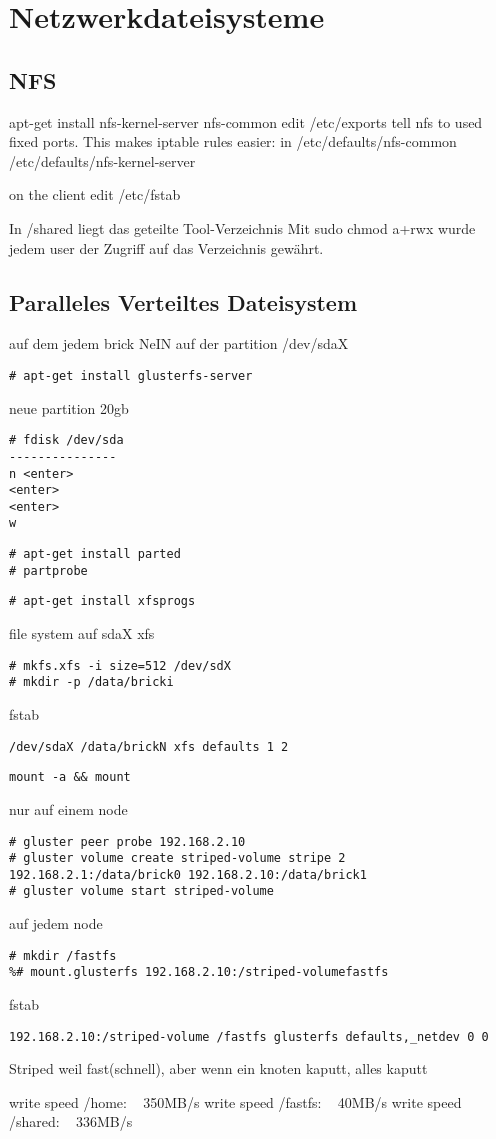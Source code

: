 \chapter{Netzwerkdateisysteme}
\section{NFS}
apt-get install nfs-kernel-server nfs-common
edit /etc/exports
tell nfs to used fixed ports. This makes iptable rules easier:
in /etc/defaults/nfs-common
/etc/defaults/nfs-kernel-server

on the client edit /etc/fstab

In /shared liegt das geteilte Tool-Verzeichnis
Mit sudo chmod a+rwx wurde jedem user der Zugriff auf das Verzeichnis gewährt.

\section{Paralleles Verteiltes Dateisystem}
auf dem jedem brick NeIN auf der partition /dev/sdaX
\begin{lstlisting}[style=Bash]
# apt-get install glusterfs-server
\end{lstlisting}
neue partition 20gb
\begin{lstlisting}[style=Bash]
# fdisk /dev/sda
---------------
n <enter>
<enter>
<enter>
w
\end{lstlisting}
\begin{lstlisting}[style=Bash]
# apt-get install parted
# partprobe
\end{lstlisting}
\begin{lstlisting}[style=Bash]
# apt-get install xfsprogs
\end{lstlisting}

file system auf sdaX xfs
\begin{lstlisting}[style=Bash]
# mkfs.xfs -i size=512 /dev/sdX
# mkdir -p /data/bricki
\end{lstlisting}
fstab
\begin{lstlisting}[style=Bash]
/dev/sdaX /data/brickN xfs defaults 1 2
\end{lstlisting}
\begin{lstlisting}[style=Bash]
mount -a && mount
\end{lstlisting}
nur auf einem node
\begin{lstlisting}[style=Bash]
# gluster peer probe 192.168.2.10
# gluster volume create striped-volume stripe 2 192.168.2.1:/data/brick0 192.168.2.10:/data/brick1
# gluster volume start striped-volume
\end{lstlisting}

auf jedem node
\begin{lstlisting}[style=Bash]
# mkdir /fastfs 
%# mount.glusterfs 192.168.2.10:/striped-volumefastfs
\end{lstlisting}
fstab
\begin{lstlisting}[style=Bash]
192.168.2.10:/striped-volume /fastfs glusterfs defaults,_netdev 0 0
\end{lstlisting}
Striped weil fast(schnell), aber wenn ein knoten kaputt, alles kaputt

write speed /home: ~ 350MB/s
write speed /fastfs: ~ 40MB/s
write speed /shared: ~ 336MB/s
